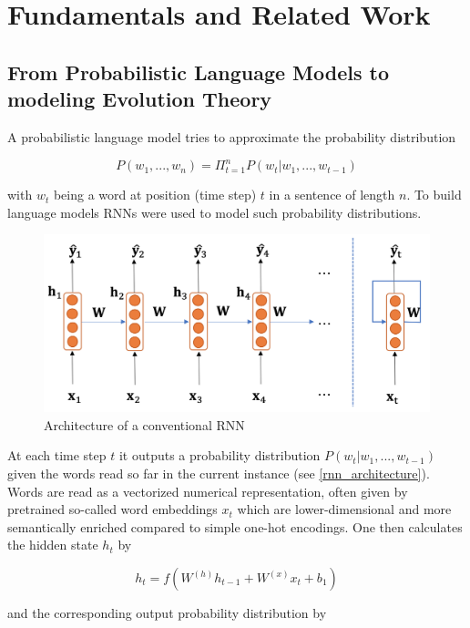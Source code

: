 \section{Fundamentals and Related Work} \label{fundamentals}

\subsection{From Probabilistic Language Models to modeling Evolution Theory} \label{fundamentalsB}

A probabilistic language model tries to approximate the probability distribution 

\begin{equation}
	P(w_1, ..., w_n) = \Pi_{t=1}^{n} P(w_t | w_1, ..., w_{t-1})
\end{equation}

with $w_t$ being a word at position (time step) $t$ in a sentence of length $n$. To build language models \acp{RNN} were used to model such probability distributions. 

\begin{figure}[ht]
	\centering
	\includegraphics[width=0.6\linewidth]{figures/rnn_architecture.png}
	\caption{Architecture of a conventional \ac{RNN} \cite[p. 46]{Gertz2020}}
	\label{rnn_architecture}
\end{figure}

At each time step $t$ it outputs a probability distribution $P(w_t | w_1, ..., w_{t-1})$ given the words read so far in the current instance (see \autoref{rnn_architecture}). Words are read as a vectorized numerical representation, often given by pretrained so-called word embeddings $x_t$ which are lower-dimensional and more semantically enriched compared to simple one-hot encodings. One then calculates the hidden state $h_t$ by

\begin{equation}
	h_t = f(W^{(h)} h_{t-1} + W^{(x)} x_t + b_1)
\end{equation}

and the corresponding output probability distribution by 

